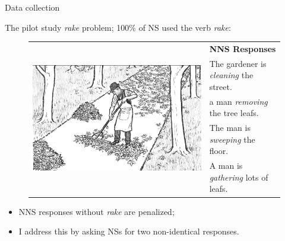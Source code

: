 \documentclass[handout,xcolor={dvipsnames}]{beamer}
\begin{document}
\begin{frame}{Data collection}

\vspace{1em}
The pilot study \textit{rake} problem; 100\% of NS used the verb \textit{rake}:


\begin{figure}[htb!]
\begin{center}
\bgroup
\def\arraystretch{1.25}
\begin{tabular}{|C{35mm}|C{65mm}|}
\hline
{} &
\textbf{NNS Responses} \\
& The gardener is \textit{cleaning} the street. \\
& a man \textit{removing} the tree leafs. \\
& The man is \textit{sweeping} the floor. \\
& A man is \textit{gathering} lots of leafs. \\
\hline
\end{tabular}
\egroup
\end{center}
\label{fig:pilot-raking}
\end{figure}


\begin{itemize}
\item NNS responses without \textit{rake} are penalized;
\item I address this by asking NSs for two non-identical responses.
\end{itemize}
\end{frame}
\end{document}
